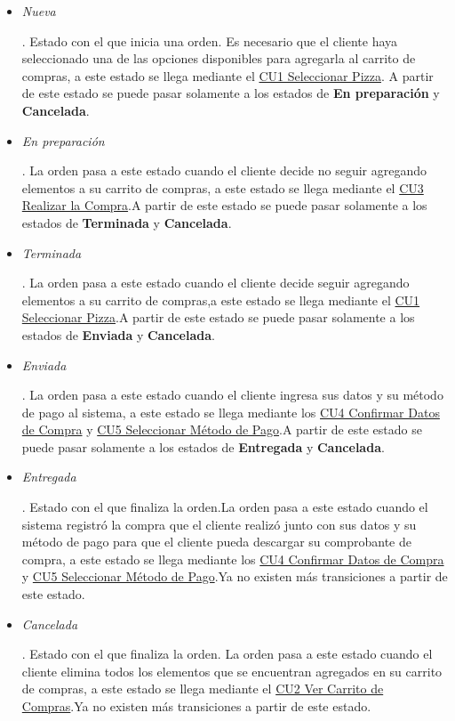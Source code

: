 		\begin{itemize}

			\item \hypertarget{cv:cs:edo:Nueva}{\textit{Nueva}}. Estado con el que inicia una orden. Es necesario que el cliente haya seleccionado una de las opciones disponibles para agregarla al carrito de compras, a este estado se llega mediante el \hyperlink{CU1}{CU1 Seleccionar Pizza}. A partir de este estado se puede pasar solamente a los estados de \textbf{En preparación} y \textbf{Cancelada}.

			\item \hypertarget{cv:cs:edo:EnPreparación}{\textit{En preparación}}. La orden pasa a este estado cuando el cliente decide no seguir agregando elementos a su carrito de compras, a este estado se llega mediante el \hyperlink{CU3}{CU3 Realizar la Compra}.A partir de este estado se puede pasar solamente a los estados de \textbf{Terminada} y \textbf{Cancelada}.
			
			\item \hypertarget{cv:cs:edo:Terminada}{\textit{Terminada}}.  La orden pasa a este estado cuando el cliente decide seguir agregando elementos a su carrito de compras,a este estado se llega mediante el \hyperlink{CU1}{CU1 Seleccionar Pizza}.A partir de este estado se puede pasar solamente a los estados de \textbf{Enviada} y \textbf{Cancelada}.
			
			\item \hypertarget{cv:cs:edo:Enviada}{\textit{Enviada}}.  La orden pasa a este estado cuando el cliente ingresa sus datos y su método de pago al sistema, a este estado se llega mediante los  \hyperlink{CU4}{CU4 Confirmar Datos de Compra} y \hyperlink{CU5}{CU5 Seleccionar Método de Pago}.A partir de este estado se puede pasar solamente a los estados de \textbf{Entregada} y \textbf{Cancelada}.
			
			\item \hypertarget{cv:cs:edo:Entregada}{\textit{Entregada}}.  Estado con el que finaliza la orden.La orden pasa a este estado cuando el sistema registró la compra que el cliente realizó junto con sus datos y su método de pago para que el cliente pueda descargar su comprobante de compra, a este estado se llega mediante los  \hyperlink{CU4}{CU4 Confirmar Datos de Compra} y \hyperlink{CU5}{CU5 Seleccionar Método de Pago}.Ya no existen más transiciones a partir de este estado.
			
			\item \hypertarget{cv:cs:edo:Cancelada}{\textit{Cancelada}}.  Estado con el que finaliza la orden. La orden pasa a este estado cuando el cliente elimina todos los elementos que se encuentran agregados en su carrito de compras, a este estado se llega mediante el \hyperlink{CU2}{CU2 Ver Carrito de Compras}.Ya no existen más transiciones a partir de este estado.
		\end{itemize}

